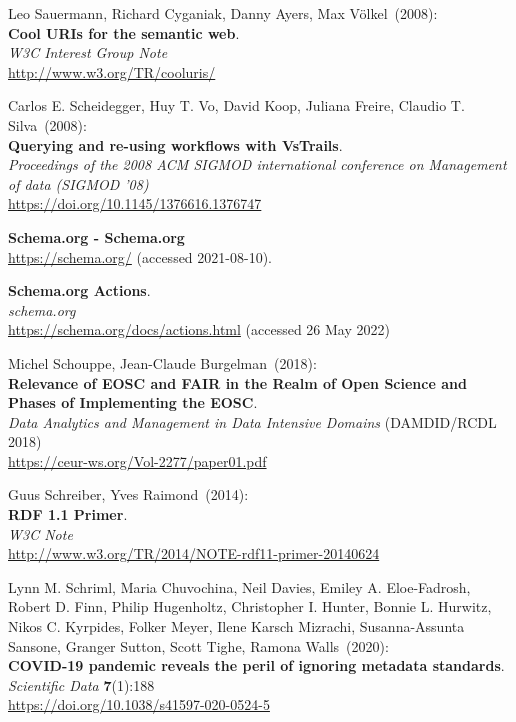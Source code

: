 \begin{thebibliography}{9}
Leo Sauermann, Richard Cyganiak, Danny Ayers, Max Völkel~(2008): \\
\textbf{Cool URIs for the semantic web}.\\
\emph{W3C Interest Group Note}\\
\url{http://www.w3.org/TR/cooluris/}

Carlos E. Scheidegger, Huy T. Vo, David Koop, Juliana Freire, Claudio T. Silva~(2008): \\
\textbf{Querying and re-using workflows with VsTrails}. \\
\emph{Proceedings of the 2008 ACM SIGMOD international conference on Management of data (SIGMOD '08)}\\
\url{https://doi.org/10.1145/1376616.1376747}

\textbf{Schema.org - Schema.org}\\
\url{https://schema.org/} (accessed 2021-08-10).

\textbf{Schema.org {Actions}}.\\
\emph{schema.org}\\
\url{https://schema.org/docs/actions.html} (accessed 26 May 2022)

Michel Schouppe, Jean-Claude Burgelman~(2018): \\
\textbf{Relevance of EOSC and FAIR in the Realm of Open Science and Phases of Implementing the EOSC}.\\
\emph{Data Analytics and Management in Data Intensive Domains} (DAMDID/RCDL 2018)\\
\url{https://ceur-ws.org/Vol-2277/paper01.pdf}

Guus Schreiber, Yves Raimond~(2014): \\
\textbf{RDF 1.1 Primer}. \\
\emph{W3C Note} \\
\url{http://www.w3.org/TR/2014/NOTE-rdf11-primer-20140624}

Lynn M. Schriml, Maria Chuvochina, Neil Davies, Emiley A. Eloe-Fadrosh, Robert D. Finn, Philip Hugenholtz, Christopher I. Hunter, Bonnie L. Hurwitz, Nikos C. Kyrpides, Folker Meyer, Ilene Karsch Mizrachi, Susanna-Assunta Sansone, Granger Sutton, Scott Tighe, Ramona Walls~(2020): \\
\textbf{COVID-19 pandemic reveals the peril of ignoring metadata standards}.\\
\emph{Scientific Data} \textbf{7}(1):188\\
\url{https://doi.org/10.1038/s41597-020-0524-5}


\end{thebibliography}
